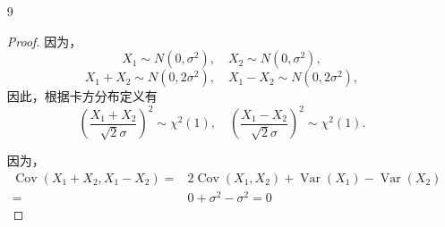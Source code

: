 \documentclass[normal,founder,mtpro2,cn]{elegantnote}
\begin{document}
\begin{enumerate}
\begin{proof}
            由于 $z=\frac{n}{m}x/\left(1+\frac{n}{m}x\right)$ 在 $(0,\infty)$ 上严格单调递增，其反函数为 $x=\frac{m}{n}\cdot\frac{z}{1-z}$，导数为 $\frac{\mathrm{d}x}{\mathrm{d}z}=\frac{m}{n}\cdot\frac{1}{(1-z)^{2}}$，因此，$Z$ 的密度函数为
            \begin{equation*}
                \begin{aligned}
                    p_{Z}(z)= & \frac{\Gamma\left(\frac{n+m}{2}\right)\left(\frac{n}{m}\right)^{\frac{n}{2}}}{\Gamma\left(\frac{n}{2}\right)\Gamma\left(\frac{m}{2}\right)}\left(\frac{m}{n}\cdot\frac{z}{1-z}\right)^{\frac{n}{2}-1}\left(1+\frac{z}{1-z}\right)^{-\frac{n+m}{2}}\cdot\frac{m}{n}\cdot\frac{1}{(1-z)^{2}} \\
                    =         & \frac{\Gamma\left(\frac{n+m}{2}\right)}{\Gamma\left(\frac{n}{2}\right)\Gamma\left(\frac{m}{2}\right)}\left(\frac{z}{1-z}\right)^{\frac{n}{2}-1}\left(\frac{1}{1-z}\right)^{-\frac{n+m}{2}}\cdot\frac{1}{(1-z)^{2}}                                                                         \\
                    =         & \frac{\Gamma\left(\frac{n+m}{2}\right)}{\Gamma\left(\frac{n}{2}\right)\Gamma\left(\frac{m}{2}\right)}z^{\frac{n}{2}-1}(1-z)^{\frac{m}{2}-1},\quad 0<z<1
                \end{aligned}
            \end{equation*}

            所以，$Z$ 服从贝塔分布 $\text{Be}\left(\frac{n}{2},\frac{m}{2}\right)$。
        \end{proof}
    \item[9]
        \begin{proof}
            因为，
            \begin{equation*}
                X_{1}\sim N(0,\sigma^2),\quad X_{2}\sim N(0,\sigma^2),
            \end{equation*}
            \begin{equation*}
                X_{1}+X_{2}\sim N(0,2\sigma^2),\quad X_{1}-X_{2}\sim N(0,2\sigma^2),
            \end{equation*}
            因此，根据卡方分布定义有
            \begin{equation*}
                \left(\frac{X_{1}+X_{2}}{\sqrt{2}\sigma}\right)^2\sim\chi^{2}(1),\quad\left(\frac{X_{1}-X_{2}}{\sqrt{2}\sigma}\right)^2\sim\chi^{2}(1).
            \end{equation*}

            因为，
            \begin{equation*}
                \begin{aligned}
                    \operatorname{Cov}(X_{1}+X_{2},X_{1}-X_{2})= & 2\operatorname{Cov}(X_{1},X_{2})+\operatorname{Var}(X_{1})-\operatorname{Var}(X_{2}) \\
                    =                                            & 0+\sigma^2-\sigma^2=0
                \end{aligned}
            \end{equation*}


\end{proof}
\end{enumerate}
\end{document}
